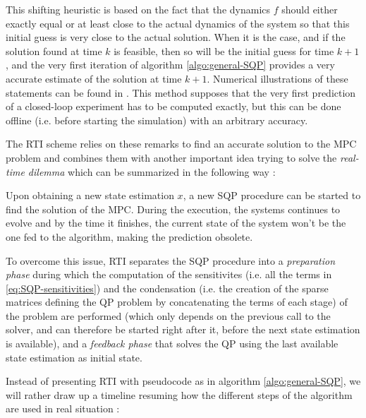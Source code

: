 \documentclass[12pt]{article}
\begin{document}
This shifting heuristic is based on the fact that the dynamics $f$ should either exactly equal or at least close to the actual dynamics of the system so that this initial guess is very close to the actual solution.
When it is the case, and if the solution found at time $k$ is feasible, then so will be the initial guess for time $k+1$, and the very first iteration of algorithm \ref{algo:general-SQP} provides a very accurate estimate of the solution at time $k+1$.
Numerical illustrations of these statements can be found in \cite{mpc-rti}.
This method supposes that the very first prediction of a closed-loop experiment has to be computed exactly, but this can be done offline (i.e. before starting the simulation) with an arbitrary accuracy.

The RTI scheme relies on these remarks to find an accurate solution to the MPC problem and combines them with another important idea trying to solve the \textit{real-time dilemma} which can be summarized in the following way :

Upon obtaining a new state estimation $x$, a new SQP procedure can be started to find the solution of the MPC.
During the execution, the systems continues to evolve and by the time it finishes, the current state of the system won't be the one fed to the algorithm, making the prediction obsolete.

To overcome this issue, RTI separates the SQP procedure into a \textit{preparation phase} during which the computation of the sensitivites (i.e. all the terms in \ref{eq:SQP-sensitivities}) and the condensation (i.e. the creation of the sparse matrices defining the QP problem by concatenating the terms of each stage) of the problem are performed (which only depends on the previous call to the solver, and can therefore be started right after it, before the next state estimation is available), and a \textit{feedback phase} that solves the QP using the last available state estimation as initial state.

Instead of presenting RTI with pseudocode as in algorithm \ref{algo:general-SQP}, we will rather draw up a timeline resuming how the different steps of the algorithm are used in real situation :

\vskip 1cm
\end{document}
